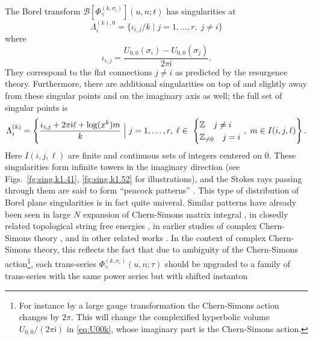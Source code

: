 \documentclass[a4paper,11pt]{article}	%
\def\mc{\mathcal}
\def\IZ{\mathbb{Z}}
\newcommand{\ri}{{\mathsf{i}}}
\newcommand{\s}{\sigma}
\begin{document}
The Borel transform $\mc{B}[\Phi_\gamma^{(k,\sigma_i)}](u,n;t)$ has
singularities at
\begin{equation}
  \Lambda_{i}^{(k),0} = \{\iota_{i,j}/k \;|\; j=1,\ldots,r,\; j\neq i\}
\end{equation}
where
\begin{equation}
  \iota_{i,j} = \frac{U_{0,0}(\s_i)-U_{0,0}(\s_j)}{2\pi\ri}.
\end{equation}
They correspond to the flat connections $j\neq i$ as predicted by the
resurgence theory.  Furthermore, there are additional singularities on
top of and slightly away from these singular points and on the
imaginary axis as well; the full set of singular points is
\begin{equation}
  \Lambda_{i}^{(k)} = \left\{
    \frac{\iota_{i,j}+2\pi\ri \ell + \log(x^k) m}{k}    \;\Big|\;
    j=1,\ldots,r,\;
    \ell\in\
    \begin{cases}
      \IZ\quad j\neq i\\
      \IZ_{\neq 0}\quad j=i
    \end{cases}\hspace{-2ex},\; m\in I(i,j,\ell)
  \right\}. \label{eq:Lmdu}
\end{equation}
Here $I(i,j,\ell)$ are finite and continuous sets of integers centered
on $0$.
These singularities form infinite towers in the imaginary direction
(see Figs.~\ref{fg:sing.k1.41}, \ref{fg:sing.k1.52} for
illustrations), and the Stokes rays passing through them are said to
form ``peacock patterns'' \cite{Garoufalidis:2020xec}.  This type of
distribution of Borel plane singularities is in fact quite
univeral. Similar patterns have already been seen in large $N$
expansion of Chern-Simons matrix integral
\cite{Pasquetti2010,Aniceto:2014hoa}, in closedly related topological
string free energies
\cite{Couso-Santamaria:2016vwq,Gu:2021ize,Alim:2021mhp,Grassi:2022zuk},
in earlier studies of complex Chern-Simons theory
\cite{Garoufalidis:2007wa}, and in other related works
\cite{Garoufalidis:2020pax}.
%
In the context of complex Chern-Simons theory, this reflects the fact
that due to ambiguity of the Chern-Simons action\footnote{For instance
  by a large gauge transformation the Chern-Simons action changes by
  $2\pi$.  This will change the complexified hyperbolic volume
  $U_{0,0}/(2\pi\ri)$ in \eqref{eq:U00k}, whose imaginary part is the
  Chern-Simons action.}, each trans-series
$\Phi_\gamma^{(k,\s_i)}(u,n;\tau)$ should be upgraded to a family of
trans-series with the same power series but with shifted instanton
\end{document}
